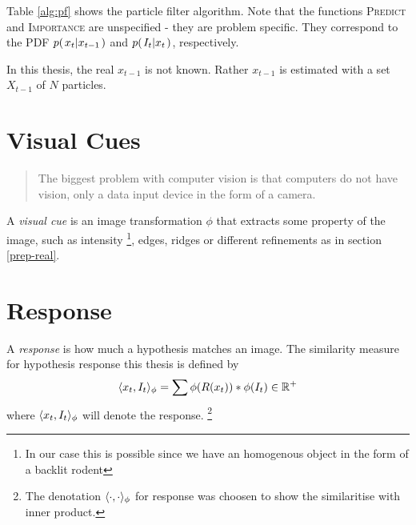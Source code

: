 Table \ref{alg:pf} shows the particle filter algorithm. Note that the
functions \textsc{Predict} and \textsc{Importance} are unspecified -
they are problem specific. They correspond to the PDF $p{(\left. x_t \middle\vert x_{t-1} \right.)}$
and $p{(\left. I_t \middle\vert x_t \right.)}$, respectively.


In this thesis, the real $x_{t-1}$ is not known. Rather $x_{t-1}$ is
estimated with a set $X_{t-1}$ of $N$ particles.

\section{Visual Cues}
\begin{quote}
    The biggest problem with computer vision is that computers do not have
    vision, only a data input device in the form of a camera.
\end{quote}
A \emph{visual cue} is an image transformation $\phi$ that extracts
some property of the image, such as intensity
\footnote{In our case this is possible since we have an homogenous object
in the form of a backlit rodent}, edges, ridges\cite{Hedvig} or different 
refinements as in section \ref{prep-real}.

\section{Response}

\begin{definition}
    A \emph{response} is how much a hypothesis matches an image. The similarity measure for hypothesis response this thesis is defined by
    \begin{equation}
        \label{eq:response}
        \langle x_t, I_t\rangle_{\phi} = \sum{\phi(R(x_t))*\phi(I_t)} \in \mathbb{R}^+
    \end{equation}
    where $\langle x_t, I_t\rangle_{\phi}$ will denote the response. 
    \footnote{The denotation $\langle \cdot, \cdot\rangle_{\phi}$ for response was choosen to show the similaritise with inner product.}

\end{definition}

